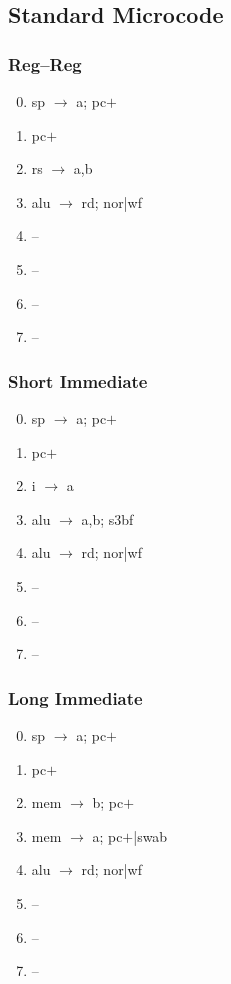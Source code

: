 \documentclass[11pt]{book}
\begin{document}
\subsection*{Standard Microcode}
\begin{multicols}{3}\ttfamily\selectfont\small
  \subsubsection*{Reg--Reg}
  \begin{enumerate}\setcounter{enumi}{-1}
  \item sp \(\rightarrow\) a; pc\(+\)
  \item pc\(+\)
  \item rs \(\rightarrow\) a,b
  \item alu \(\rightarrow\) rd; nor|wf
  \item --
  \item --
  \item --
  \item --
  \end{enumerate}
  \columnbreak
  \subsubsection*{Short Immediate}
  \begin{enumerate}\setcounter{enumi}{-1}
  \item sp \(\rightarrow\) a; pc\(+\)
  \item pc\(+\)
  \item i \(\rightarrow\) a
  \item alu \(\rightarrow\) a,b; s3bf
  \item alu \(\rightarrow\) rd; nor|wf
  \item --
  \item --
  \item --
  \end{enumerate}
  \columnbreak
  \subsubsection*{Long Immediate}
  \begin{enumerate}\setcounter{enumi}{-1}
  \item sp \(\rightarrow\) a; pc\(+\)
  \item pc\(+\)
  \item mem \(\rightarrow\) b; pc\(+\)
  \item mem \(\rightarrow\) a; pc\(+\)|swab
  \item alu \(\rightarrow\) rd; nor|wf
  \item --
  \item --
  \item --
  \end{enumerate}
\end{multicols}
\end{document}
